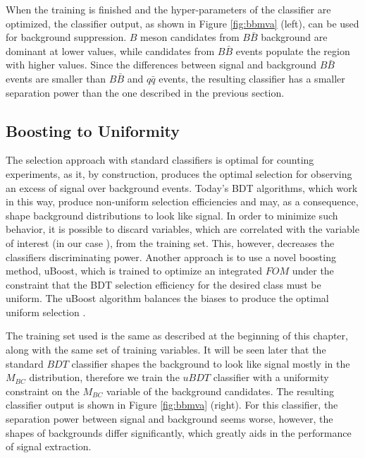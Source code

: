 When the training is finished and the hyper-parameters of the classifier are optimized, the classifier output, as shown in Figure \ref{fig:bbmva} (left), can be used for background suppression. $B$ meson candidates from $B \bar B$ background are dominant at lower values, while candidates from $B \bar B$ events populate the region with higher values. Since the differences between signal and background $B \bar B$ events are smaller than $B \bar B$ and $q \bar q$ events, the resulting classifier has a smaller separation power than the one described in the previous section.

\subsection{Boosting to Uniformity}
The selection approach with standard classifiers is optimal for counting experiments, as it, by construction, produces the optimal selection for observing an excess of signal over background events. Today's BDT algorithms, which work in this way, produce non-uniform selection efficiencies and may, as a consequence, shape background distributions to look like signal. In order to minimize such behavior, it is possible to discard variables, which are correlated with the variable of interest (in our case \vars), from the training set. This, however, decreases the classifiers discriminating power. Another approach is to use a novel boosting method, uBoost, which is trained to optimize an integrated $FOM$ under the constraint that the BDT selection efficiency for the desired class must be uniform. The uBoost algorithm balances the biases to produce the optimal uniform selection \cite{stevens2013uboost}.

The training set used is the same as described at the beginning of this chapter, along with the same set of training variables. It will be seen later that the standard $BDT$ classifier shapes the background to look like signal mostly in the $M_{BC}$ distribution, therefore we train the $uBDT$ classifier with a uniformity constraint on the $M_{BC}$ variable of the background candidates. The resulting classifier output is shown in Figure \ref{fig:bbmva} (right). For this classifier, the separation power between signal and background seems worse, however, the shapes of backgrounds differ significantly, which greatly aids in the performance of signal extraction.


